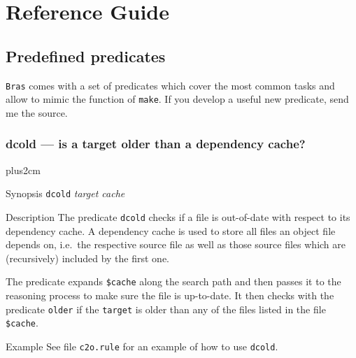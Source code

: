 \documentclass[11pt,bibtotoc,idxtotoc]{scrreprt}
\newcommand{\Bras}{\texttt{Bras}}
\newcommand{\make}{\texttt{make}}
\begin{document}
\chapter{Reference Guide}

\newcommand{\Tt}[1]{\texttt{#1}}
\newcommand{\It}[1]{\textit{#1}}
\newcommand{\Flash}[1]{\fbox{\bfseries #1}}
\newcommand{\Sflabel}[1]{%
  \parbox[b]{\labelwidth}{%
    \makebox[1pt][l]{\textsf{\bfseries#1:}}\\\strut}}
  
\newenvironment{Describe}
{\vskip0pt plus2cm\begin{list}{}{\renewcommand{\makelabel}{\Sflabel}}}
{\end{list}\pagebreak[2]}

\section{Predefined predicates}
\label{sec:predicates}

\Bras{} comes with a set of predicates which cover the most common
tasks and allow to mimic the function of \make{}. If you develop a
useful new predicate, send me the source.

\subsection{dcold --- is a target older than a dependency cache?}
\label{pred:dcold}
\begin{Describe}
\item[Synopsis] \Tt{dcold} \It{target cache}
\item[Description] The predicate \texttt{dcold} checks if a file is
  out-of-date with respect to its dependency cache. A dependency cache
  is used to store all files an object file depends on, i.e.\ the
  respective source file as well as those source files which are
  (recursively) included by the first one.
  
  The predicate expands \texttt{\$cache} along the search path and
  then passes it to the reasoning process to make sure the file is
  up-to-date. It then checks with the predicate \texttt{older} if the
  \texttt{target} is older than any of the files listed in the file
  \texttt{\$cache}.
\item[Example] See file \texttt{c2o.rule} for an example of how to use 
  \texttt{dcold}.
\end{Describe}
\end{document}
